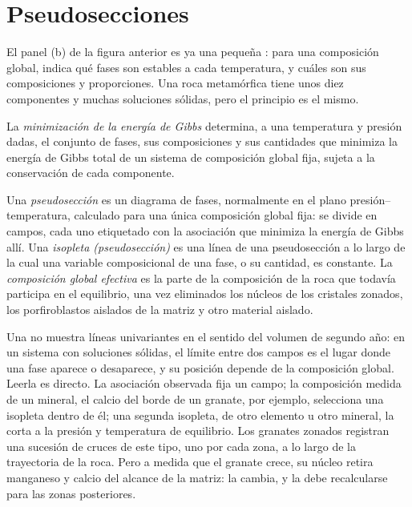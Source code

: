 \section{Pseudosecciones}\label{sec:b3:petrological-thermodynamics:pseudosections}

El panel (b) de la figura anterior es ya una pequeña : para una
composición global, indica qué fases son estables a cada temperatura, y cuáles son sus
composiciones y proporciones. Una roca metamórfica tiene unos diez
componentes y muchas soluciones sólidas, pero el principio es el mismo.

\begin{definition}\label{def:b3:petrological-thermodynamics:minimisation}
La \emph{minimización de la energía de Gibbs} determina, a una
temperatura y presión dadas, el conjunto de fases, sus composiciones y
sus cantidades que minimiza la energía de Gibbs total de un sistema de composición
global fija, sujeta a la conservación de cada componente.
\end{definition}

\begin{definition}\label{def:b3:petrological-thermodynamics:pseudosection}
Una \emph{pseudosección} es un diagrama de fases, normalmente en
el plano presión--temperatura, calculado para una única composición global fija: se
divide en campos, cada uno etiquetado con la asociación que minimiza la
energía de Gibbs allí. Una \emph{isopleta (pseudosección)}
es una línea de una pseudosección a lo largo de la cual una variable composicional
de una fase, o su cantidad, es constante. La \emph{composición global
efectiva} es la parte de la composición de la roca
que todavía participa en el equilibrio, una vez eliminados los núcleos de los
cristales zonados, los porfiroblastos aislados de la matriz y otro
material aislado.
\end{definition}

Una  no muestra líneas univariantes en el sentido del
volumen de segundo año: en un sistema con soluciones sólidas, el límite entre dos campos es el
lugar donde una fase aparece o desaparece, y su posición depende de la composición global.
Leerla es directo. La asociación observada fija un campo;
la composición medida de un mineral, el calcio del borde de un granate, por ejemplo,
selecciona una isopleta dentro de él; una segunda isopleta, de otro elemento
u otro mineral, la corta a la presión y temperatura de
equilibrio. Los granates zonados registran una sucesión de cruces de este tipo, uno por cada
zona, a lo largo de la trayectoria de la roca. Pero a medida que el granate crece, su núcleo
retira manganeso y calcio del alcance de la matriz: la 
cambia, y la  debe recalcularse para las zonas
posteriores.

